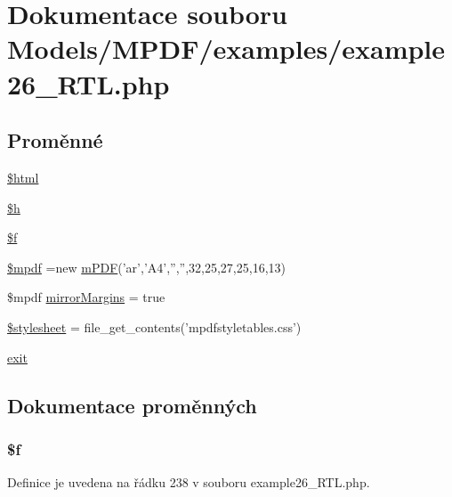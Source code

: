 \hypertarget{example26___r_t_l_8php}{\section{Dokumentace souboru Models/\-M\-P\-D\-F/examples/example26\-\_\-\-R\-T\-L.php}
\label{example26___r_t_l_8php}
}
\subsection*{Proměnné}
\begin{DoxyCompactItemize}
\item 
\hyperlink{example26___r_t_l_8php_a6f96e7fc92441776c9d1cd3386663b40}{\$html}
\item 
\hyperlink{example26___r_t_l_8php_ab00da9d5d8bd5b6b944793e093860aff}{\$h}
\item 
\hyperlink{example26___r_t_l_8php_a23c42e7d231a63025b55e4eb7e3d4c99}{\$f}
\item 
\hyperlink{example26___r_t_l_8php_ad028f81910d6cbab9b184d2214b3a8f8}{\$mpdf} =new \hyperlink{classm_p_d_f}{m\-P\-D\-F}('ar','A4','','',32,25,27,25,16,13)
\item 
\$mpdf \hyperlink{example26___r_t_l_8php_a24c284cb7774410f65953584ea1fd9c1}{mirror\-Margins} = true
\item 
\hyperlink{example26___r_t_l_8php_a19e5cf73e817c55a49205e6ec78c88a8}{\$stylesheet} = file\-\_\-get\-\_\-contents('mpdfstyletables.\-css')
\item 
\hyperlink{example26___r_t_l_8php_a6733eb5f605d09eaede9845835d71c4e}{exit}
\end{DoxyCompactItemize}


\subsection{Dokumentace proměnných}
\hypertarget{example26___r_t_l_8php_a23c42e7d231a63025b55e4eb7e3d4c99}{
\subsubsection[{\$f}]{\setlength{\rightskip}{0pt plus 5cm}\$f}}\label{example26___r_t_l_8php_a23c42e7d231a63025b55e4eb7e3d4c99}


Definice je uvedena na řádku 238 v souboru example26\-\_\-\-R\-T\-L.\-php.



